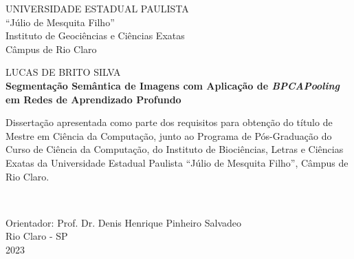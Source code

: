 \newpage
\thispagestyle{empty}

\begin{center}
    UNIVERSIDADE ESTADUAL PAULISTA\\
    “Júlio de Mesquita Filho”\\
    Instituto de Geociências e Ciências Exatas\\
    Câmpus de Rio Claro
    
    \vspace{2cm}
    {LUCAS DE BRITO SILVA\\}
    \vspace{2cm}
    \textbf{Segmentação Semântica de Imagens com Aplicação de \textit{BPCAPooling} em Redes de Aprendizado Profundo}
    
    \vspace{4cm}
    
    \hspace{.45\linewidth}
    \begin{minipage}{.50\linewidth}
    \small
        Dissertação apresentada como parte dos requisitos para obtenção do título de Mestre em Ciência da Computação, junto ao Programa de Pós-Graduação do Curso de Ciência da Computação, do Instituto de Biociências, Letras e Ciências Exatas da Universidade Estadual Paulista “Júlio de Mesquita Filho”, Câmpus de Rio Claro.
    \end{minipage} \\
    
    \vspace{1cm}

    Orientador: Prof. Dr. Denis Henrique Pinheiro Salvadeo\\
    
    \vfill
    \normalsize
    Rio Claro - SP \\
    2023
\end{center}